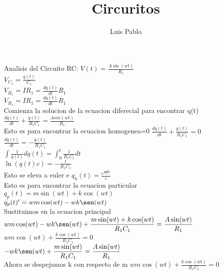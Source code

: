 \documentclass[12pt]{article}
\title{Circuritos}
\author{Luis Pablo}
\newcommand{\derivada}[2]{\displaystyle{\frac{d#1}{d#2}}}
\newcommand{\e}[1]{e^{#1}}
\newcommand{\integral}[4]{\int_{#1}^{#2}{#3}{#4}}
\newcommand{\escribir}[1]{\singlespacing#1\singlespacing}
\newcommand{\fraccion}[2]{\displaystyle\frac{#1}{#2}}
\begin{document}
\maketitle

	\escribir{Analisis del Circuito RC:}
	$V(t)=\fraccion{A\sin(wt)}{R_1}$\\

	$V_{C_1}=\displaystyle{\frac{q(t)}{C_1}} $\\

	$V_{R_1}=IR_1=\derivada{q(t)}{t}R_1$\\

	$V_{R_1}=IR_1=\derivada{q(t)}{t}R_1$\\

	\escribir{Comienza la solucion de la ecuacion diferecial para encontrar q(t)}
	$\derivada{q(t)}{t}+\fraccion{q(t)}{R_1C_1}=\fraccion{Asin(wt)}{R_1}$\\

	\escribir{Esto es para encontrar la ecuacion homogenea=0}
	$\derivada{q(t)}{t}+\fraccion{q(t)}{R_1C_1}=0$\\

	$\derivada{q(t)}{t}=-\fraccion{q(t)}{R_1C_1}$\\

	$\displaystyle{\int\fraccion{1}{q(t)}dq(t)}=\displaystyle{\integral{0}{t}{\displaystyle{\frac{1}{R_1C_1}}}{dt}}$\\

	$\ln (q(t)c)=-\displaystyle{\frac{t}{R_1C_1}}$\\

	\escribir{Esto se eleva a euler e}
	$q_{h}(t)=\fraccion{\e{\frac{-t}{R_1C_1}}}{c}$\\

	\escribir{Esto es para encontrar la ecuacion particular}
	$q_{p}(t)=m\sin(wt)+k\cos(wt)$\\

	$q_{p}(t)'=wm\cos(wt)-wk\sen(wt)$\\

	\escribir{Sustituimos en la ecuacion principal}
	$wm\cos(wt)-wk\sen(wt)+\fraccion{m\sin(wt)+k\cos(wt)}{R_1C_1}=\fraccion{A\sin(wt)}{R_1}$\\

	$wm\cos(wt)+\fraccion{k\cos(wt)}{R_1C_1}=0$\\

	$-wk\sen(wt)+\fraccion{m\sin(wt)}{R_1C_1}=\fraccion{A\sin(wt)}{R_1}$\\
	
	\escribir{Ahora se despejamos k con respecto de m}
	$wm\cos(wt)+\fraccion{k\cos(wt)}{R_1C_1}=0$\\
\end{document}
